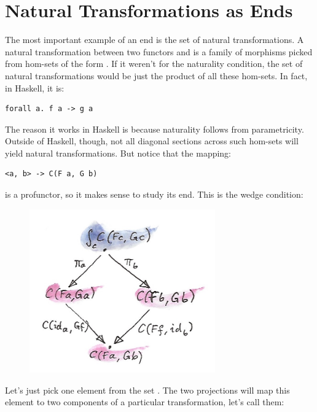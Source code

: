 \section{Natural Transformations as
Ends}\label{natural-transformations-as-ends}

The most important example of an end is the set of natural
transformations. A natural transformation between two functors
 and  is a family of morphisms picked from hom-sets
of the form . If it weren't for the naturality
condition, the set of natural transformations would be just the product
of all these hom-sets. In fact, in Haskell, it is:

\begin{Verbatim}[commandchars=\\\{\}]
forall a. f a -> g a
\end{Verbatim}
The reason it works in Haskell is because naturality follows from
parametricity. Outside of Haskell, though, not all diagonal sections
across such hom-sets will yield natural transformations. But notice that
the mapping:

\begin{Verbatim}[commandchars=\\\{\}]
<a, b> -> C(F a, G b)
\end{Verbatim}
is a profunctor, so it makes sense to study its end. This is the wedge
condition:

\begin{figure}[H]
\centering
\includegraphics[width=80mm]{images/end1.jpg}
\end{figure}

\noindent
Let's just pick one element from the set .
The two projections will map this element to two components of a
particular transformation, let's call them:

